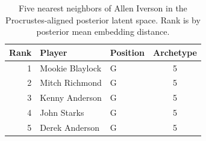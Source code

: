 \begin{table}[htbp]
  \centering\small
  \begin{tabular}{rllc}
    \toprule
    Rank & Player & Position & Archetype \\
    \midrule
    1 & Mookie Blaylock & G & 5 \\
    2 & Mitch Richmond & G & 5 \\
    3 & Kenny Anderson & G & 5 \\
    4 & John Starks & G & 5 \\
    5 & Derek Anderson & G & 5 \\
    \bottomrule
  \end{tabular}
  \caption{Five nearest neighbors of Allen Iverson in the Procrustes-aligned posterior latent space. Rank is by posterior mean embedding distance.}
  \label{tab:Allen_Iverson_neighbors}
\end{table}

